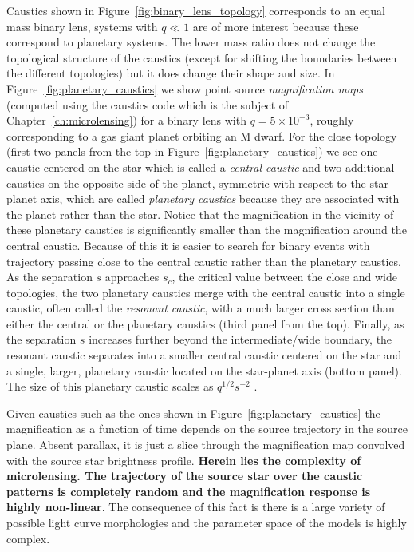 \documentclass[12pt]{report}
\begin{document}
Caustics shown in Figure~\ref{fig:binary_lens_topology} corresponds to an equal
mass binary lens, systems with $q\ll 1$ are of more interest because these
correspond to planetary systems. The lower mass ratio does not change the
topological structure of the caustics (except for shifting the boundaries
between the different topologies) but it does change their shape and size. In
Figure~\ref{fig:planetary_caustics} we show point source \emph{magnification
    maps} (computed using the \textsf{caustics} code which is the subject of
Chapter~\ref{ch:microlensing}) for a binary lens with $q=5\times 10^{-3}$,
roughly corresponding to a gas giant planet orbiting an M dwarf. For the close
topology (first two panels from the top in Figure~\ref{fig:planetary_caustics})
we see one caustic centered on the star which is called a \emph{central
    caustic} and two additional caustics on the opposite side of the planet,
symmetric with respect to the star-planet axis, which are called
\emph{planetary caustics} because they are associated with the planet rather
than the star. Notice that the magnification in the vicinity of these planetary
caustics is significantly smaller than the magnification around the central
caustic. Because of this it is easier to search for binary events with
trajectory passing close to the central caustic rather than the planetary
caustics. As the separation $s$ approaches $s_c$, the critical value between
the close and wide topologies, the two planetary caustics merge with the
central caustic into a single caustic, often called the \emph{resonant
    caustic}, with a much larger cross section than either the central or the
planetary caustics (third panel from the top). Finally, as the separation $s$
increases further beyond the intermediate/wide boundary, the resonant caustic
separates into a smaller central caustic centered on the star and a single,
larger, planetary caustic located on the star-planet axis (bottom panel). The
size of this planetary caustic scales as $q^{1/2}s^{-2}$ \citep[see references
    in review by][]{Gaudi2012}.

Given caustics such as the ones shown in Figure~\ref{fig:planetary_caustics}
the magnification as a function of time depends on the source trajectory in the
source plane. Absent parallax, it is just a slice through the magnification map
convolved with the source star brightness profile. \textbf{Herein lies the
    complexity of microlensing. The trajectory of the source star over the caustic
    patterns is completely random and the magnification response is highly
    non-linear}. The consequence of this fact is there is a large variety of
possible light curve morphologies and the parameter space of the models is
highly complex.
\end{document}
